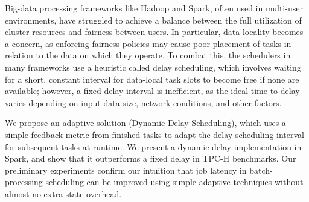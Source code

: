 Big-data processing frameworks like Hadoop and Spark, often used in multi-user environments, 
have struggled to achieve a balance between the full utilization of cluster resources and fairness between users. 
In particular, data locality becomes a concern, as enforcing fairness policies may cause poor placement of tasks in relation to the data on which they operate. 
To combat this, the schedulers in many frameworks use a heuristic called delay scheduling, 
which involves waiting for a short, constant interval for data-local task slots to become free if none are available; 
however, a fixed delay interval is inefficient, as the ideal time to delay varies depending on input data size, network conditions, and other factors.

We propose an adaptive solution (Dynamic Delay Scheduling), which uses a simple feedback metric from finished tasks to adapt the delay scheduling interval for 
subsequent tasks at runtime. We present a dynamic delay implementation in Spark, and show that it outperforms a fixed delay in TPC-H benchmarks. 
Our preliminary experiments confirm our intuition that job latency in batch-processing scheduling can be improved
using simple adaptive techniques without almost no extra state overhead.
